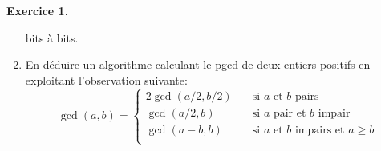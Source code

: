 \documentclass[french,a4paper]{article}
\theoremstyle{definition}
\newtheorem{exercise}{Exercice}
\theoremstyle{remark}
\begin{document}
\begin{exercise}
\begin{enumerate}[label=(\arabic*)]
    bits à bits.
  \item En déduire un algorithme calculant le pgcd de deux entiers
    positifs en exploitant l'observation suivante:
    \begin{displaymath}
      \operatorname{gcd}(a,b) = \left\{
        \begin{aligned}
          2\operatorname{gcd}(a/2,b/2)
          &\quad \text{si $a$ et $b$ pairs} \\
          \operatorname{gcd}(a/2,b)
          &\quad \text{si $a$ pair et $b$ impair} \\
          \operatorname{gcd}(a-b,b)
          &\quad \text{si $a$ et $b$ impairs et $a\geq b$} \\
        \end{aligned}
      \right.
    \end{displaymath}
  \end{enumerate}
\end{exercise}
\end{document}
